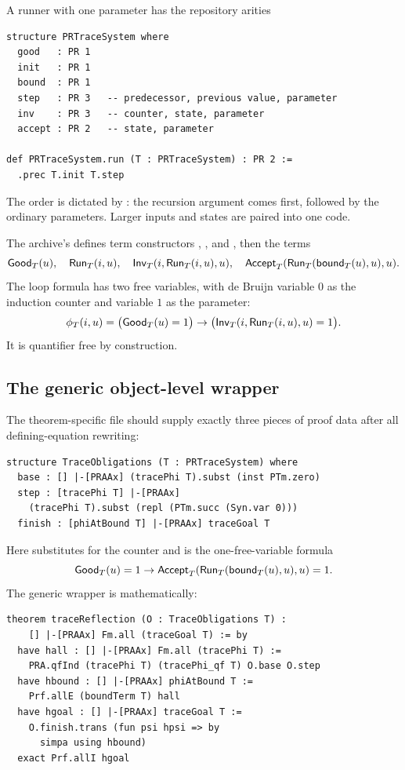 A runner with one parameter has the repository arities
\begin{lstlisting}
structure PRTraceSystem where
  good   : PR 1
  init   : PR 1
  bound  : PR 1
  step   : PR 3   -- predecessor, previous value, parameter
  inv    : PR 3   -- counter, state, parameter
  accept : PR 2   -- state, parameter

def PRTraceSystem.run (T : PRTraceSystem) : PR 2 :=
  .prec T.init T.step
\end{lstlisting}
The order is dictated by : the recursion argument comes first, followed by the ordinary parameters.  Larger inputs and states are paired into one code.

The archive's  defines term constructors , , and , then the terms
\[
 \mathsf{Good}_T(u),\quad \mathsf{Run}_T(i,u),\quad
 \mathsf{Inv}_T(i,\mathsf{Run}_T(i,u),u),\quad
 \mathsf{Accept}_T(\mathsf{Run}_T(\mathsf{bound}_T(u),u),u).
\]
The loop formula has two free variables, with de Bruijn variable $0$ as the induction counter and variable $1$ as the parameter:
\[
 \phi_T(i,u)=\bigl(\mathsf{Good}_T(u)=1\bigr)\to
 \bigl(\mathsf{Inv}_T(i,\mathsf{Run}_T(i,u),u)=1\bigr).
\]
It is quantifier free by construction.

\subsection{The generic object-level wrapper}

The theorem-specific file should supply exactly three pieces of proof data after all defining-equation rewriting:

\begin{lstlisting}
structure TraceObligations (T : PRTraceSystem) where
  base : [] |-[PRAAx] (tracePhi T).subst (inst PTm.zero)
  step : [tracePhi T] |-[PRAAx]
    (tracePhi T).subst (repl (PTm.succ (Syn.var 0)))
  finish : [phiAtBound T] |-[PRAAx] traceGoal T
\end{lstlisting}

Here  substitutes  for the counter and  is the one-free-variable formula
\[
 \mathsf{Good}_T(u)=1\to
 \mathsf{Accept}_T(\mathsf{Run}_T(\mathsf{bound}_T(u),u),u)=1.
\]
The generic wrapper is mathematically:

\begin{lstlisting}
theorem traceReflection (O : TraceObligations T) :
    [] |-[PRAAx] Fm.all (traceGoal T) := by
  have hall : [] |-[PRAAx] Fm.all (tracePhi T) :=
    PRA.qfInd (tracePhi T) (tracePhi_qf T) O.base O.step
  have hbound : [] |-[PRAAx] phiAtBound T :=
    Prf.allE (boundTerm T) hall
  have hgoal : [] |-[PRAAx] traceGoal T :=
    O.finish.trans (fun psi hpsi => by
      simpa using hbound)
  exact Prf.allI hgoal
\end{lstlisting}

